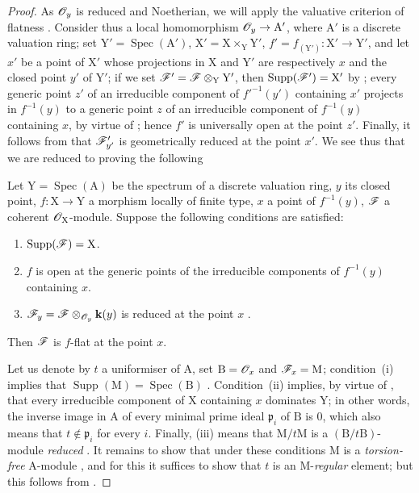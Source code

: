 \begin{proof}
\label{IV.15.2.2-proof}
As $\mathscr{O}_y$ is reduced and Noetherian, we will apply the valuative criterion of flatness .
Consider thus a local homomorphism $\mathscr{O}_y\to\mathrm{A}'$, where $\mathrm{A}'$ is a discrete valuation ring; set $\mathrm{Y}'=\operatorname{Spec}(\mathrm{A}')$, $\mathrm{X}'=\mathrm{X}\times_\mathrm{Y}\mathrm{Y}'$, $f'=f_{(\mathrm{Y}')}:\mathrm{X}'\to\mathrm{Y}'$, and let $x'$ be a point of $\mathrm{X}'$ whose projections in $\mathrm{X}$ and $\mathrm{Y}'$ are respectively $x$ and the closed point $y'$ of $\mathrm{Y}'$; if we set $\mathscr{F}'=\mathscr{F}\otimes_\mathrm{Y}\mathrm{Y}'$, then $\operatorname{Supp}(\mathscr{F}')=\mathrm{X}'$ by ; every generic point $z'$ of an irreducible component of $f'^{-1}(y')$ containing $x'$ projects in $f^{-1}(y)$ to a generic point $z$ of an irreducible component of $f^{-1}(y)$ containing $x$, by virtue of ; hence $f'$ is universally open at the point $z'$.
Finally, it follows from  that $\mathscr{F}_{y'}'$ is geometrically reduced at the point $x'$.
We see thus that we are reduced to proving the following

\begin{lemma}[15.2.2.1]
\label{IV.15.2.2.1}
Let $\mathrm{Y}=\operatorname{Spec}(\mathrm{A})$ be the spectrum of a discrete valuation ring, $y$ its closed point, $f:\mathrm{X}\to\mathrm{Y}$ a morphism locally of finite type, $x$ a point of $f^{-1}(y)$, $\mathscr{F}$ a coherent $\mathscr{O}_\mathrm{X}$-module.
Suppose the following conditions are satisfied:
\begin{enumerate}[label=(\roman*)]
  \item $\operatorname{Supp}(\mathscr{F})=\mathrm{X}$.
  \item $f$ is open at the generic points of the irreducible components of $f^{-1}(y)$ containing $x$.
  \item $\mathscr{F}_y=\mathscr{F}\otimes_{\mathscr{O}_y}\mathbf{k}(y)$ is reduced at the point $x$ .
\end{enumerate}
Then $\mathscr{F}$ is $f$-flat at the point $x$.
\end{lemma}

Let us denote by $t$ a uniformiser of $\mathrm{A}$, set $\mathrm{B}=\mathscr{O}_x$ and $\mathscr{F}_x=\mathrm{M}$; condition~(i) implies that $\operatorname{Supp}(\mathrm{M})=\operatorname{Spec}(\mathrm{B})$ .
Condition~(ii) implies, by virtue of , that every irreducible component of $\mathrm{X}$ containing $x$ dominates $\mathrm{Y}$; in other words, the inverse image in $\mathrm{A}$ of every minimal prime ideal $\mathfrak{p}_i$ of $\mathrm{B}$ is $0$, which also means that $t\notin\mathfrak{p}_i$ for every $i$. Finally, (iii) means that $\mathrm{M}/t\mathrm{M}$ is a $(\mathrm{B}/t\mathrm{B})$-module \emph{reduced} .
It remains to show that under these conditions $\mathrm{M}$ is a \emph{torsion-free} $\mathrm{A}$-module , and for this it suffices to show that $t$ is an $\mathrm{M}$-\emph{regular} element; but this follows from .
\end{proof}

